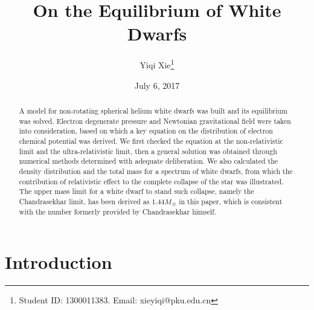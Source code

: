 \documentclass[a4paper,11pt]{article}
\numberwithin{equation}{section}
\numberwithin{table}{section}
\numberwithin{figure}{section}
\begin{document}
	
	
	\title{On the Equilibrium of White Dwarfs}
	\author{Yiqi Xie\thanks{Student ID: 1300011383. Email: xieyiqi@pku.edu.cn}}
	\date{July 6, 2017}
	\maketitle
	\thispagestyle{empty}
	\begin{abstract}
		A model for non-rotating spherical helium white dwarfs was built and its equilibrium was solved. Electron degenerate pressure and Newtonian gravitational field were taken into consideration, based on which a key equation on the distribution of electron chemical potential was derived. We first checked the equation at the non-relativistic limit and the ultra-relativistic limit, then a general solution was obtained through numerical methods determined with adequate deliberation. We also calculated the density distribution and the total mass for a spectrum of white dwarfs, from which the contribution of relativistic effect to the complete collapse of the star was illustrated. The upper mass limit for a white dwarf to stand such collapse, namely the Chandrasekhar limit, has been derived as $1.44M_{\astrosun}$ in this paper, which is consistent with the number formerly provided by Chandrasekhar himself.
	\end{abstract}
	
	\section{Introduction}
	
\end{document}
